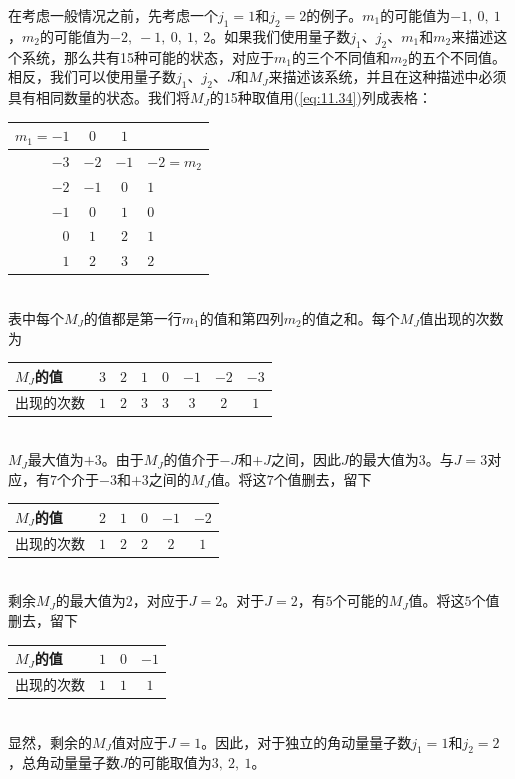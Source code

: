     在考虑一般情况之前，先考虑一个$j_1 = 1$和$j_2 = 2$的例子。$m_1$的可能值为$-1, \: 0, \: 1$，$m_2$的可能值为$-2, \: -1, \: 0, \: 1, \: 2$。如果我们使用量子数$j_1$、$j_2$、$m_1$和$m_2$来描述这个系统，那么共有15种可能的状态，对应于$m_1$的三个不同值和$m_2$的五个不同值。相反，我们可以使用量子数$j_1$、$j_2$、$J$和$M_J$来描述该系统，并且在这种描述中必须具有相同数量的状态。我们将$M_J$的15种取值用(\ref{eq:11.34})列成表格：
    \begin{table}[htbp]
        \centering
        \begin{tabular}{rcc|l}
            $m_1 = -1$ & $0$ & $1$ & \\
            \hline
            $-3$ & $-2$ & $-1$ & $-2 = m_2$ \\
            $-2$ & $-1$ & $0$ & $1$ \\
            $-1$ & $0$ & $1$ & $0$ \\
            $0$ & $1$ & $2$ & $1$ \\
            $1$ & $2$ & $3$ & $2$
        \end{tabular}
    \end{table} \\
    表中每个$M_J$的值都是第一行$m_1$的值和第四列$m_2$的值之和。每个$M_J$值出现的次数为
    \begin{table}[htbp]
        \centering
        \begin{tabular}{l|c|c|c|c|c|c|c}
            $M_J$的值 & $3$ & $2$ & $1$ & $0$ & $-1$ & $-2$ & $-3$ \\
            \hline
            出现的次数 & $1$ & $2$ & $3$ & $3$ & $3$ & $2$ & $1$  
        \end{tabular}
    \end{table} \\
    $M_J$最大值为$+3$。由于$M_J$的值介于$-J$和$+J$之间，因此$J$的最大值为$3$。与$J=3$对应，有$7$个介于$-3$和$+3$之间的$M_J$值。将这$7$个值删去，留下
    \begin{table}[htbp]
        \centering
        \begin{tabular}{l|c|c|c|c|c}
            $M_J$的值 & $2$ & $1$ & $0$ & $-1$ & $-2$ \\
            \hline
            出现的次数 & $1$ & $2$ & $2$ & $2$ & $1$
        \end{tabular}
    \end{table} \\
    剩余$M_J$的最大值为$2$，对应于$J=2$。对于$J=2$，有$5$个可能的$M_J$值。将这$5$个值删去，留下
    \begin{table}[h!]
        \centering
        \begin{tabular}{l|c|c|c}
            $M_J$的值 & $1$ & $0$ & $-1$ \\
            \hline
            出现的次数 & $1$ & $1$ & $1$
        \end{tabular}
    \end{table} \\
    显然，剩余的$M_J$值对应于$J = 1$。因此，对于独立的角动量量子数$j_1 = 1$和$j_2 = 2$，总角动量量子数$J$的可能取值为$3, \: 2, \: 1$。

